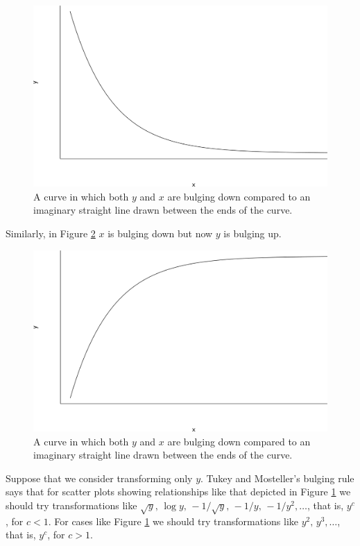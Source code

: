 \documentclass[
  11pt,
  british,
  openany, a4paper]{book}
\begin{document}
\begin{figure}

{\centering \includegraphics[width=0.75\linewidth]{images/hollow_up} 

}

\caption{A curve in which both $y$ and $x$ are bulging down compared to an imaginary straight line drawn between the ends of the curve.}\label{fig:hollowup}
\end{figure}

Similarly, in Figure \ref{fig:hollowdown} \(x\) is bulging down but now \(y\) is bulging up.

\begin{figure}

{\centering \includegraphics[width=0.75\linewidth]{images/hollow_down} 

}

\caption{A curve in which both $y$ and $x$ are bulging down compared to an imaginary straight line drawn between the ends of the curve.}\label{fig:hollowdown}
\end{figure}

Suppose that we consider transforming only \(y\). Tukey and Mosteller's bulging rule says that for scatter plots showing relationships like that depicted in Figure \ref{fig:hollowup} we should try transformations like \(\sqrt{y}, \, \log y, \,-1/\sqrt{y}, \, -1/y, \, -1/y^2, \ldots\), that is, \(y^c\), for \(c < 1\). For cases like Figure \ref{fig:hollowup} we should try transformations like \(y^2, \, y^3, \ldots\), that is, \(y^c\), for \(c > 1\).
\end{document}
